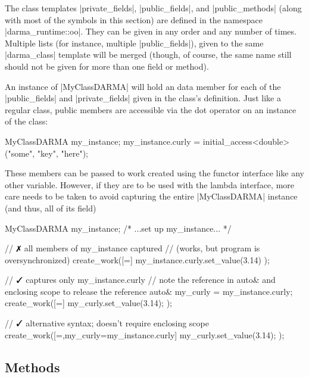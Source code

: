 The class templates |private_fields|, |public_fields|, and |public_methods|
(along with most of the symbols in this section) are defined in the namespace
|darma_runtime::oo|.  They can be given in any order and any number of times. 
Multiple lists (for instance, multiple |public_fields|), given to the
same |darma_class| template will be merged (though, of course, the same name
still should not be given for more than one field or method).

An instance of |MyClassDARMA| will hold an \ahandleT data member for each of the
|public_fields| and |private_fields| given in the class's definition.  Just like
a regular class, public members are accessible via the dot operator on an
instance of the class:

\begin{CppCodeNumb}
MyClassDARMA my_instance;
my_instance.curly = initial_access<double>("some", "key", "here");
\end{CppCodeNumb}
These members can be passed to work created using the functor interface like any
other variable.  However, if they are to be used with the lambda interface, more
care needs to be taken to avoid capturing the entire |MyClassDARMA| instance
(and thus, all of its field)
\begin{CppCodeNumb}
MyClassDARMA my_instance;
/* ...set up my_instance... */

// $\no$ all members of my_instance captured
// (works, but program is oversynchronized)
create_work([=]{
  my_instance.curly.set_value(3.14)
});

// $\yes$ captures only my_instance.curly
// note the reference in auto& and enclosing scope to release the reference
{
  auto& my_curly = my_instance.curly;
  create_work([=]{
    my_curly.set_value(3.14);
  });
}

// $\yes$ alternative syntax; doesn't require enclosing scope
create_work([=,my_curly=my_instance.curly]{
  my_curly.set_value(3.14);
});
\end{CppCodeNumb}

\subsection{Methods}

